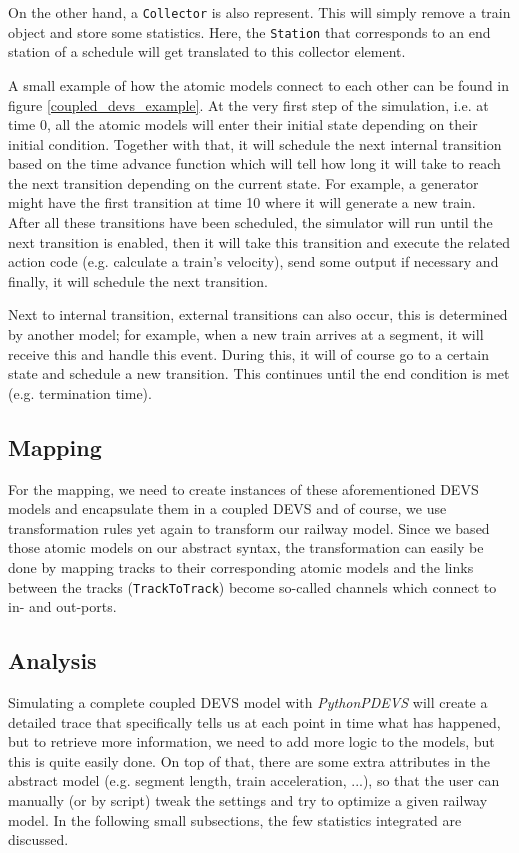 \documentclass{article}
\begin{document}
On the other hand, a \texttt{Collector} is also represent. This will simply remove a train object and store some statistics. Here, the \texttt{Station} that corresponds to an end station of a schedule will get translated to this collector element.

A small example of how the atomic models connect to each other can be found in figure \ref{coupled_devs_example}. At the very first step of the simulation, i.e. at time 0, all the atomic models will enter their initial state depending on their initial condition. Together with that, it will schedule the next internal transition based on the time advance function which will tell how long it will take to reach the next transition depending on the current state. For example, a generator might have the first transition at time 10 where it will generate a new train. After all these transitions have been scheduled, the simulator will run until the next transition is enabled, then it will take this transition and execute the related action code (e.g. calculate a train's velocity), send some output if necessary and finally, it will schedule the next transition.

Next to internal transition, external transitions can also occur, this is determined by another model; for example, when a new train arrives at a segment, it will receive this and handle this event. During this, it will of course go to a certain state and schedule a new transition. This continues until the end condition is met (e.g. termination time).

\subsection{Mapping}

For the mapping, we need to create instances of these aforementioned DEVS models and encapsulate them in a coupled DEVS and of course, we use transformation rules yet again to transform our railway model. Since we based those atomic models on our abstract syntax, the transformation can easily be done by mapping tracks to their corresponding atomic models and the links between the tracks (\texttt{TrackToTrack}) become so-called channels which connect to in- and out-ports.

\subsection{Analysis}

Simulating a complete coupled DEVS model with \textit{PythonPDEVS} will create a detailed trace that specifically tells us at each point in time what has happened, but to retrieve more information, we need to add more logic to the models, but this is quite easily done. On top of that, there are some extra attributes in the abstract model (e.g. segment length, train acceleration, ...), so that the user can manually (or by script) tweak the settings and try to optimize a given railway model. In the following small subsections, the few statistics integrated are discussed.
\end{document}
